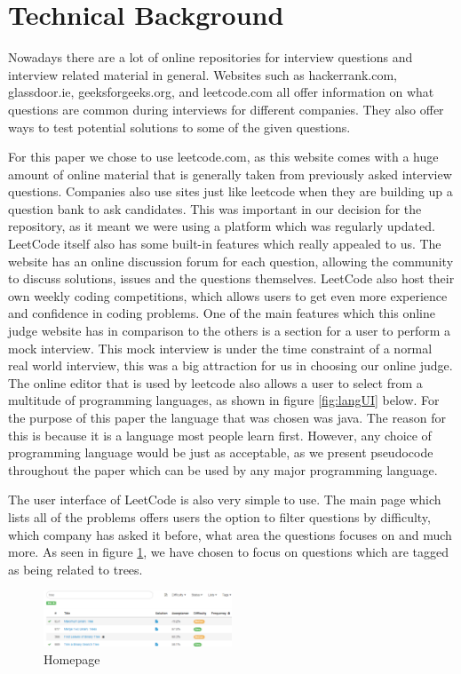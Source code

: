 \documentclass[10pt,twocolumn]{IEEEtran}
\begin{document}
\section{Technical Background}
\par Nowadays there are a lot of online repositories for interview questions and interview related material in general. Websites such as hackerrank.com, glassdoor.ie, geeksforgeeks.org, and leetcode.com all offer information on what questions are common during interviews for different companies. They also offer ways to test potential solutions to some of the given questions. 
\par For this paper we chose to use leetcode.com\cite{leet1}, as this website comes with a huge amount of online material that is generally taken from previously asked interview questions. Companies also use sites just like leetcode when they are building up a question bank to ask candidates. This was important in our decision for the repository, as it meant we were using a platform which was regularly updated. LeetCode itself also has some built-in features which really appealed to us. The website has an online discussion forum for each question, allowing the community to discuss solutions, issues and the questions themselves. LeetCode also host their own weekly coding competitions, which allows users to get even more experience and confidence in coding problems. One of the main features which this online judge website has in comparison to the others is a section for a user to perform a mock interview. This mock interview is under the time constraint of a normal real world interview, this was a big attraction for us in choosing our online judge. The online editor that is used by leetcode also allows a user to select from a multitude of programming languages, as shown in figure \ref{fig:langUI} below. For the purpose of this paper the language that was chosen was java. The reason for this is because it is a language most people learn first. However, any choice of programming language would be just as acceptable, as we present pseudocode throughout the paper which can be used by any major programming language.  
\par The user interface of LeetCode is also very simple to use. The main page which lists all of the problems offers users the option to filter questions by difficulty, which company has asked it before, what area the questions focuses on and much more. As seen in figure \ref{fig:homepage}, we have chosen to focus on questions which are tagged as being related to trees. 
\begin{figure}[h]
\includegraphics[width=0.5\textwidth]{homepageUI.png}
\caption{Homepage}
\label{fig:homepage}
\end{figure}
\end{document}
